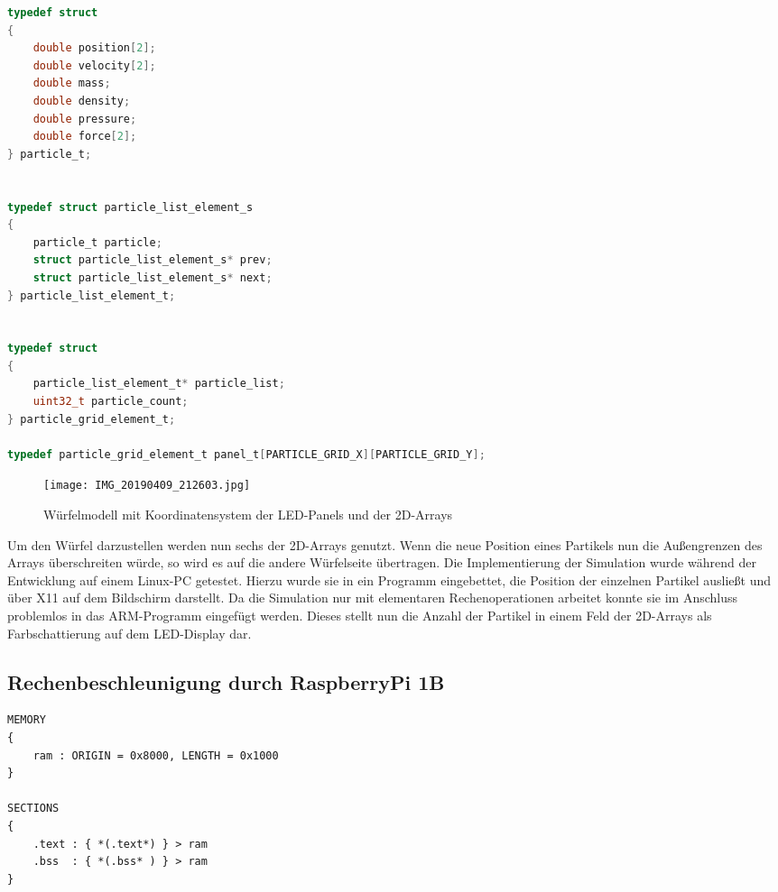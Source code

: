 \begin{lstlisting}[language={c}, caption={Datenstrukturen der SPH}, label={code.sph.structs}]
typedef struct
{
	double position[2];
	double velocity[2];
	double mass;
	double density;
	double pressure;
	double force[2];
} particle_t;


typedef struct particle_list_element_s
{
	particle_t particle;
	struct particle_list_element_s* prev;
	struct particle_list_element_s* next;
} particle_list_element_t;


typedef struct
{
	particle_list_element_t* particle_list;
	uint32_t particle_count;
} particle_grid_element_t;

typedef particle_grid_element_t panel_t[PARTICLE_GRID_X][PARTICLE_GRID_Y];
\end{lstlisting}

\begin{wrapfigure}{r}{0.5\textwidth}
	\centering
	\texttt{[image: IMG\_20190409\_212603.jpg]}
	\caption{Würfelmodell mit Koordinatensystem der LED-Panels und der 2D-Arrays}
	\label{fig:sph:cube_model}
\end{wrapfigure}

Um den Würfel darzustellen werden nun sechs der 2D-Arrays genutzt. Wenn die neue Position eines Partikels nun die Außengrenzen des Arrays überschreiten würde, so wird es auf die andere Würfelseite übertragen. Die Implementierung der Simulation wurde während der Entwicklung auf einem Linux-PC getestet. Hierzu wurde sie in ein Programm eingebettet, die Position der einzelnen Partikel ausließt und über X11 auf dem Bildschirm darstellt. Da die Simulation nur mit elementaren Rechenoperationen arbeitet konnte sie im Anschluss problemlos in das ARM-Programm eingefügt werden. Dieses stellt nun die Anzahl der Partikel in einem Feld der 2D-Arrays als Farbschattierung auf dem LED-Display dar.

\subsection{Rechenbeschleunigung durch RaspberryPi 1B}
\FloatBarrier

\begin{lstlisting}[caption={Memorymap des Raspberry Pi 1B}, label={code.sph.rp.memmap}]
MEMORY
{
	ram : ORIGIN = 0x8000, LENGTH = 0x1000
}

SECTIONS
{
	.text : { *(.text*) } > ram
	.bss  : { *(.bss* ) } > ram
}
\end{lstlisting}

